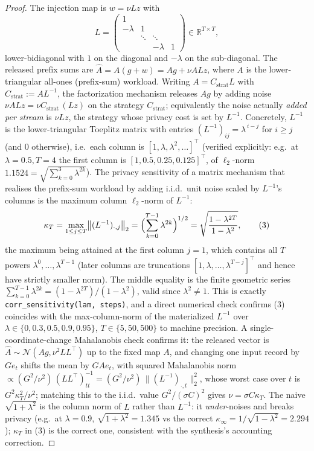 \begin{proof}
The injection map is $w=\nu L z$ with
\[
L=\begin{pmatrix}1&&&\\ -\lambda&1&&\\ &\ddots&\ddots&\\ &&-\lambda&1\end{pmatrix}\in\mathbb R^{T\times T},
\]
lower-bidiagonal with $1$ on the diagonal and $-\lambda$ on the sub-diagonal. The released prefix sums are $\hat A=A(g+w)=Ag+\nu AL z$, where $A$ is the lower-triangular all-ones (prefix-sum) workload. Writing $A=C_{\mathrm{strat}}L$ with $C_{\mathrm{strat}}:=AL^{-1}$, the factorization mechanism releases $Ag$ by adding noise $\nu A L z=\nu C_{\mathrm{strat}}\,(Lz)$ on the strategy $C_{\mathrm{strat}}$; equivalently the noise actually \emph{added per stream} is $\nu L z$, the strategy whose privacy cost is set by $L^{-1}$. Concretely, $L^{-1}$ is the lower-triangular Toeplitz matrix with entries $(L^{-1})_{ij}=\lambda^{\,i-j}$ for $i\ge j$ (and $0$ otherwise), i.e.\ each column is $[1,\lambda,\lambda^2,\dots]^\top$ (verified explicitly: e.g.\ at $\lambda=0.5,T=4$ the first column is $[1,0.5,0.25,0.125]^\top$, of $\ell_2$-norm $1.1524=\sqrt{\sum_{k=0}^3\lambda^{2k}}$). The privacy sensitivity of a matrix mechanism that realises the prefix-sum workload by adding i.i.d.\ unit noise scaled by $L^{-1}$'s columns is the maximum column $\ell_2$-norm of $L^{-1}$:
\[
\kappa_T=\max_{1\le j\le T}\bigl\|(L^{-1})_{\cdot,j}\bigr\|_2
=\Bigl(\sum_{k=0}^{T-1}\lambda^{2k}\Bigr)^{1/2}
=\sqrt{\frac{1-\lambda^{2T}}{1-\lambda^{2}}},
\tag{3}
\]
the maximum being attained at the first column $j=1$, which contains all $T$ powers $\lambda^0,\dots,\lambda^{T-1}$ (later columns are truncations $[1,\lambda,\dots,\lambda^{T-j}]^\top$ and hence have strictly smaller norm). The middle equality is the finite geometric series $\sum_{k=0}^{T-1}\lambda^{2k}=(1-\lambda^{2T})/(1-\lambda^2)$, valid since $\lambda^2\ne1$. This is exactly \texttt{corr\_sensitivity(lam, steps)}, and a direct numerical check confirms (3) coincides with the max-column-norm of the materialized $L^{-1}$ over $\lambda\in\{0,0.3,0.5,0.9,0.95\}$, $T\in\{5,50,500\}$ to machine precision. A single-coordinate-change Mahalanobis check confirms it: the released vector is $\hat A\sim\mathcal N(Ag,\nu^2 LL^\top)$ up to the fixed map $A$, and changing one input record by $G e_t$ shifts the mean by $G A e_t$, with squared Mahalanobis norm $\propto (G^2/\nu^2)\,(L L^\top)^{-1}_{tt}=(G^2/\nu^2)\,\|(L^{-1})_{\cdot,t}\|_2^2$, whose worst case over $t$ is $G^2\kappa_T^2/\nu^2$; matching this to the i.i.d.\ value $G^2/(\sigma C)^2$ gives $\nu=\sigma C\kappa_T$. The naive $\sqrt{1+\lambda^2}$ is the column norm of $L$ rather than $L^{-1}$: it \emph{under}-noises and breaks privacy (e.g.\ at $\lambda=0.9$, $\sqrt{1+\lambda^2}=1.345$ vs the correct $\kappa_\infty=1/\sqrt{1-\lambda^2}=2.294$); $\kappa_T$ in (3) is the correct one, consistent with the synthesis's accounting correction.


\end{proof}
